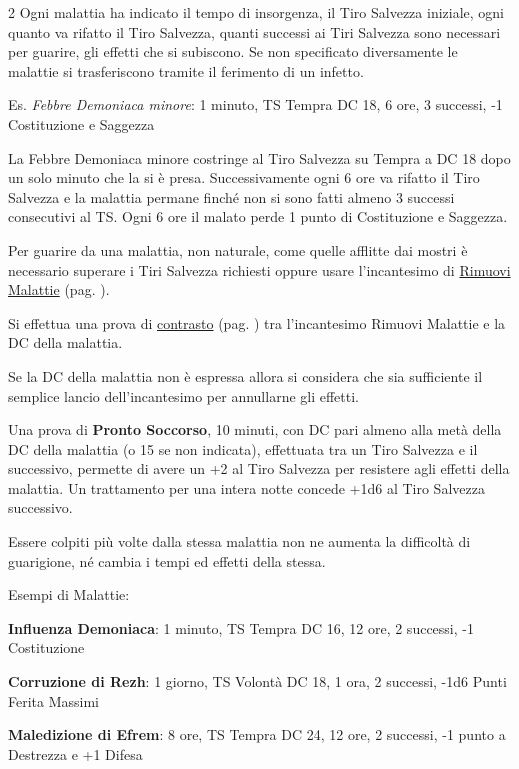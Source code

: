 \begin{multicols}{2}
Ogni malattia ha indicato il tempo di insorgenza, il Tiro Salvezza iniziale, ogni quanto va rifatto il Tiro Salvezza, quanti successi ai Tiri Salvezza sono necessari per guarire, gli effetti che si subiscono. Se non specificato diversamente le malattie si trasferiscono tramite il ferimento di un infetto.

Es. \emph{Febbre Demoniaca minore}: 1 minuto, TS Tempra DC 18, 6 ore, 3 successi, -1 Costituzione e Saggezza

La Febbre Demoniaca minore costringe al Tiro Salvezza su Tempra a DC 18 dopo un solo minuto che la si è presa. Successivamente ogni 6 ore va rifatto il Tiro Salvezza e la malattia permane finché non si sono fatti almeno 3 successi consecutivi al TS. Ogni 6 ore il malato perde 1 punto di Costituzione e Saggezza.

Per guarire da una malattia, non naturale, come quelle afflitte dai mostri è necessario superare i Tiri Salvezza richiesti oppure usare l'incantesimo di \hyperlink{rimuovimalattie}{Rimuovi Malattie} (pag. \pageref{rimuovimalattie}).

Si effettua una prova di \hyperlink{contrastareincantesimi}{contrasto} (pag. \pageref{contrastareincantesimi}) tra l'incantesimo Rimuovi Malattie e la DC della malattia.

Se la DC della malattia non è espressa allora si considera che sia sufficiente il semplice lancio dell'incantesimo per annullarne gli effetti.

Una prova di \textbf{Pronto Soccorso}, 10 minuti, con DC pari almeno alla metà della DC della malattia (o 15 se non indicata), effettuata tra un Tiro Salvezza e il successivo, permette di avere un +2 al Tiro Salvezza per resistere agli effetti della malattia. Un trattamento per una intera notte concede +1d6 al Tiro Salvezza successivo.

Essere colpiti più volte dalla stessa malattia non ne aumenta la difficoltà di guarigione, né cambia i tempi ed effetti della stessa.

Esempi di Malattie:

\textbf{Influenza Demoniaca}: 1 minuto, TS Tempra DC 16, 12 ore, 2 successi, -1 Costituzione

\textbf{Corruzione di Rezh}: 1 giorno, TS Volontà DC 18, 1 ora, 2 successi, -1d6 Punti Ferita Massimi

\textbf{Maledizione di Efrem}: 8 ore, TS Tempra DC 24, 12 ore, 2 successi, -1 punto a Destrezza e +1 Difesa


\end{multicols}
